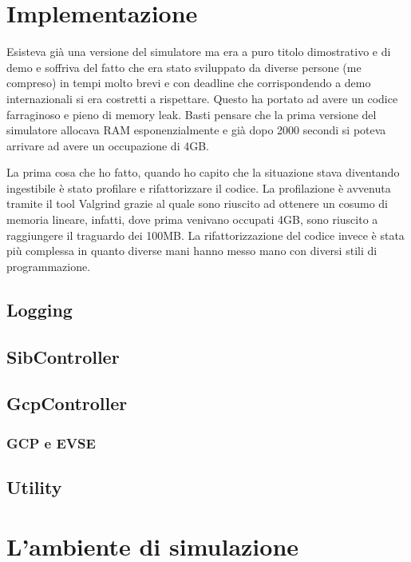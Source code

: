 \section{Implementazione}

Esisteva già una versione del simulatore ma era a puro titolo dimostrativo e di demo e soffriva del fatto che era stato sviluppato da diverse persone (me compreso) in tempi molto brevi e con deadline che corrispondendo a demo internazionali si era costretti a rispettare. Questo ha portato ad avere un codice farraginoso e pieno di memory leak. Basti pensare che la prima versione del simulatore allocava RAM esponenzialmente e già dopo 2000 secondi si poteva arrivare ad avere un occupazione di 4GB.

La prima cosa che ho fatto, quando ho capito che la situazione stava diventando ingestibile è stato profilare e rifattorizzare il codice. La profilazione è avvenuta tramite il tool Valgrind grazie al quale sono riuscito ad ottenere un cosumo di memoria lineare, infatti, dove prima venivano occupati 4GB, sono riuscito a raggiungere il traguardo dei 100MB. La rifattorizzazione del codice invece è stata più complessa in quanto diverse mani hanno messo mano con diversi stili di programmazione. 

\subsection{Logging}

\subsection{SibController}

\subsection{GcpController}

\subsubsection{GCP e EVSE}

\subsection{Utility}

\section{L'ambiente di simulazione}

